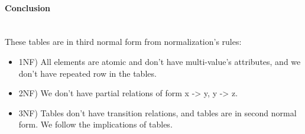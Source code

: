 \documentclass{article}
\begin{document}
\paragraph{Conclusion\\\\}
These tables are in third normal form from normalization's rules:
\begin{itemize}
\item 1NF) All elements are atomic and don't have multi-value's attributes, and we don't have repeated row in the tables.
\item 2NF) We don't have partial relations of form x -> y, y -> z.
\item 3NF) Tables don't have transition relations, and tables are in second normal form. We follow the implications of tables.
\end{itemize}
\end{document}

